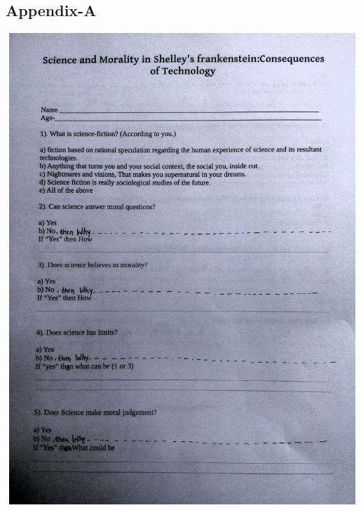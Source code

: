 \documentclass[12pt]{report}
\begin{document}
\subsection{Appendix-A}
\includegraphics[width=6in,height=7in]{a1.jpg}
\end{document}
